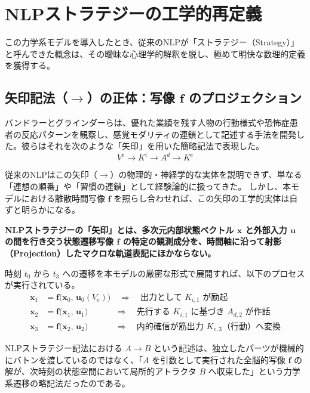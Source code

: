 \section{NLPストラテジーの工学的再定義}

この力学系モデルを導入したとき、従来のNLPが「ストラテジー（Strategy）」と呼んできた概念は、その曖昧な心理学的解釈を脱し、極めて明快な数理的定義を獲得する。

\subsection{矢印記法（$\longrightarrow$）の正体：写像 $\boldsymbol{f}$ のプロジェクション}
バンドラーとグラインダーらは、優れた業績を残す人物の行動様式や恐怖症患者の反応パターンを観察し、感覚モダリティの連鎖として記述する手法を開発した。彼らはそれを次のような「矢印」を用いた簡略記法で表現した。
\begin{equation}
    V^e \longrightarrow K^i \longrightarrow A^d \longrightarrow K^e
\end{equation}

従来のNLPはこの矢印（$\longrightarrow$）の物理的・神経学的な実体を説明できず、単なる「連想の順番」や「習慣の連鎖」として経験論的に扱ってきた。
しかし、本モデルにおける離散時間写像 $\boldsymbol{f}$ を照らし合わせれば、この矢印の工学的実体は自ずと明らかになる。

\textbf{NLPストラテジーの「矢印」とは、多次元内部状態ベクトル $\boldsymbol{x}$ と外部入力 $\boldsymbol{u}$ の間を行き交う状態遷移写像 $\boldsymbol{f}$ の特定の観測成分を、時間軸に沿って射影（Projection）したマクロな軌道表記にほかならない。}

時刻 $t_0$ から $t_3$ への遷移を本モデルの厳密な形式で展開すれば、以下のプロセスが実行されている。
\begin{align}
    \boldsymbol{x}_1 &= \boldsymbol{f}\big( \boldsymbol{x}_0, \, \boldsymbol{u}_0(V_e) \big) \quad \Longrightarrow \quad \text{出力として } K_{i,1} \text{ が励起} \\
    \boldsymbol{x}_2 &= \boldsymbol{f}\big( \boldsymbol{x}_1, \, \boldsymbol{u}_1 \big) \quad\quad\quad\; \Longrightarrow \quad \text{先行する } K_{i,1} \text{ に基づき } A_{d,2} \text{ が作話} \\
    \boldsymbol{x}_3 &= \boldsymbol{f}\big( \boldsymbol{x}_2, \, \boldsymbol{u}_2 \big) \quad\quad\quad\; \Longrightarrow \quad \text{内的確信が筋出力 } K_{e,3} \text{（行動）へ変換}
\end{align}

NLPストラテジー記法における $A \longrightarrow B$ という記述は、独立したパーツが機械的にバトンを渡しているのではなく、「$A$ を引数として実行された全脳的写像 $\boldsymbol{f}$ の解が、次時刻の状態空間において局所的アトラクタ $B$ へ収束した」という力学系遷移の略記法だったのである。

